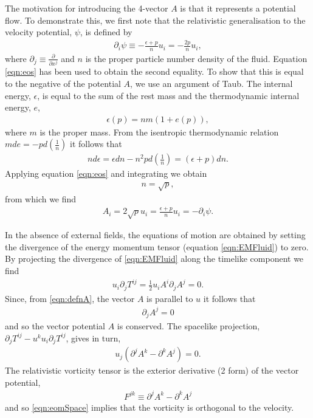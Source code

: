 \documentclass[10pt, fleqn,final,showtrims,oldfontcommands, article,a4paper,oneside]{memoir} %
\newcommand{\eqa}[1]{\begin{align}#1\end{align}}
\newcommand{\eqal}[2]{\begin{align}#1\label{eqn:#2}\end{align}}
\newcommand{\eqnref}[1]{\ref{eqn:#1}}
\newcommand{\lr}[1]{\left( #1 \right)}
\renewcommand{\d}{\partial}
\newcommand{\del}{\nabla}
\newcommand{\scope}[1]{\tilde{#1}}
\newcommand{\half}{\tfrac{1}{2}}
\begin{document}
The motivation for introducing the 4-vector $A$ is that it represents a potential flow.
To demonstrate this, we first note that the relativistic generalisation to the velocity potential, $\psi$,  is defined\cite{LandauBook} by
\begin{align}
  \d_i \psi \equiv - \frac{\epsilon+p}{n} u_i = - \frac{2 p}{n} u_i,
\end{align}
where $\d_j \equiv \frac{\d}{\d x^j}$ and  $n$ is the proper particle number density of the fluid.
Equation \eqnref{eos} has been used to obtain the second equality.
To show that this is equal to the negative of the potential $A$, we use an argument of Taub\cite{Taub1978}.
The internal energy, $\epsilon$, is equal to the sum of the rest mass and the thermodynamic internal energy\cite{LandauBook, Taub1978}, $e$, 
\begin{align}
  \epsilon(p) = nm( 1 + e(p)),
\end{align}
where $m$ is the proper mass.
From the isentropic thermodynamic relation $m de = - p d\lr{\frac{1}{n}}$
it follows that 
\begin{align}
 n d\epsilon = \epsilon dn - n^2 p d \lr{\frac{1}{n}} = \lr{\epsilon + p} dn.
\end{align}
Applying equation \eqnref{eos} and integrating we obtain
\begin{align}
n = \sqrt p,
\end{align}
from which we find
\begin{align}
A_i = 2\sqrt p  u_i = \frac{\epsilon + p}{n} u_i = - \d_i \psi.
\label{eqn:AisPotFlow}
\end{align}




In the absence of external fields, the equations of motion are obtained by setting the 
 divergence of the energy momentum tensor (equation \eqnref{EMFluid}) to zero.
By projecting the divergence of \eqnref{EMFluid} along the timelike component we find
\eqa{
  u_i \d_j T^{i j} = \half u_i A^i \d_j A^j = 0.
}
Since, from \eqnref{defnA}, the vector $A$ is parallel to $u$  it follows that 
\eqal{
  \d_j A^j = 0
}{eomTime}
and so the vector potential $A$ is conserved.
The spacelike projection,
$\d_j T^{i j} - u^k u_i \d_j T^{i j}$, gives in turn,
\eqal{
u_j \lr{\d^j A^k - \d^k A^j} = 0.
}{eomSpace}
The relativistic vorticity tensor is the exterior derivative (2 form) of the vector potential, 
\eqal{
F^{j k} \equiv \d^j A^k - \d^k A^j
}{DefnVorticity}
and so \eqnref{eomSpace} implies that the vorticity is orthogonal to the velocity.
\end{document}
